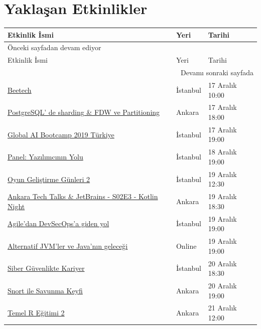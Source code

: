 \documentclass[11pt]{article}
\begin{document}
\section{Yaklaşan Etkinlikler}
\label{sec:org5b01282}
\begin{longtable}{|p{8cm}|l|l|}
\hline
Etkinlik İsmi & Yeri & Tarihi\\
\hline
\endfirsthead
\multicolumn{3}{l}{Önceki sayfadan devam ediyor} \\
\hline

Etkinlik İsmi & Yeri & Tarihi \\

\hline
\endhead
\hline\multicolumn{3}{r}{Devamı sonraki sayfada} \\
\endfoot
\endlastfoot
\hline
\href{https://www.ariteknokent.com.tr/tr/ekosistem/beetech}{Beetech} & İstanbul & 17 Aralık 10:00\\
\href{https://www.eventbrite.com/e/postgresql-de-sharding-fdw-ve-partitioning-tickets-85763158917}{PostgreSQL' de sharding \& FDW ve Partitioning} & Ankara & 17 Aralık 18:00\\
\href{https://www.meetup.com/Teknolot/events/267080760/}{Global AI Bootcamp 2019 Türkiye} & İstanbul & 17 Aralık 19:00\\
\href{https://kommunity.com/software-craftsmanship-turkey/events/panel-yazilimcinin-yolu}{Panel: Yazılımcının Yolu} & İstanbul & 18 Aralık 19:00\\
\href{https://www.eventbrite.com/e/oyun-gelistirme-gunleri-2-tickets-84091625315}{Oyun Geliştirme Günleri 2} & İstanbul & 19 Aralık 12:30\\
\href{https://www.meetup.com/Ankara-Tech-Talks/events/267184427/}{Ankara Tech Talks \& JetBrains - S02E3 - Kotlin Night} & Ankara & 19 Aralık 18:30\\
\href{https://www.meetup.com/Sahibinden-D2D-Events/events/267159689/}{Agile’dan DevSecOps’a giden yol} & İstanbul & 19 Aralık 19:00\\
\href{https://www.meetup.com/Istanbul-Java-User-Group/events/267106749/}{Alternatif JVM'ler ve Java'nın geleceği} & Online & 19 Aralık 19:00\\
\href{https://www.eventbrite.com/e/siber-guvenlikte-kariyer-tickets-85975261321?aff=ebdssbdestsearch}{Siber Güvenlikte Kariyer} & İstanbul & 20 Aralık 18:30\\
\href{https://www.eventbrite.com/e/snort-ile-savunma-keyfi-hacknightsorg-tickets-78022805311}{Snort ile Savunma Keyfi} & Ankara & 20 Aralık 19:00\\
\href{https://www.meetup.com/rladies-ankara/events/267184624/}{Temel R Eğitimi 2} & Ankara & 21 Aralık 12:00\\

\end{longtable}
\end{document}
